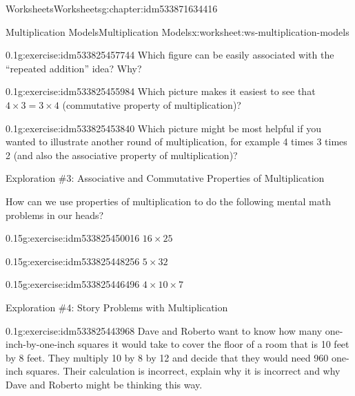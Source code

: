 \documentclass[twoside,11pt,]{book}
\begin{document}
\begin{chapterptx}{Worksheets}{}{Worksheets}{}{}{g:chapter:idm533871634416}
\begin{worksheet-section-numberless}{Multiplication Models}{}{Multiplication Models}{}{}{x:worksheet:ws-multiplication-models}
\begin{introduction}{}
\begin{description}
\begin{sidebyside}{1}{0.3}{0.3}{0}
\begin{sbspanel}{0.4}
\end{sbspanel}%
\end{sidebyside}%
\end{description}
\end{introduction}%
\begin{divisionexercise}{5}{}{0.1}{g:exercise:idm533825457744}%
Which figure can be easily associated with the ``repeated addition'' idea? Why?%
\end{divisionexercise}%
\begin{divisionexercise}{6}{}{0.1}{g:exercise:idm533825455984}%
Which picture makes it easiest to see that \(4 \times 3 = 3 \times 4 \) (commutative property of multiplication)?%
\end{divisionexercise}%
\begin{divisionexercise}{7}{}{0.1}{g:exercise:idm533825453840}%
Which picture might be most helpful if you wanted to illustrate another round of multiplication, for example 4 times 3 times 2 (and also the associative property of multiplication)?%
\end{divisionexercise}%
\clearpage
\begin{introduction}{}%
Exploration \#3: Associative and Commutative Properties of Multiplication%
\par
How can we use properties of multiplication to do the following mental math problems in our heads?%
\end{introduction}%
\begin{divisionexercise}{8}{}{0.15}{g:exercise:idm533825450016}%
\(16 \times 25  \)%
\end{divisionexercise}%
\begin{divisionexercise}{9}{}{0.15}{g:exercise:idm533825448256}%
\(5 \times 32  \)%
\end{divisionexercise}%
\begin{divisionexercise}{10}{}{0.15}{g:exercise:idm533825446496}%
\(4 \times 10 \times 7  \)%
\end{divisionexercise}%
\begin{introduction}{}%
Exploration \#4: Story Problems with Multiplication\end{introduction}%
\begin{divisionexercise}{11}{}{0.1}{g:exercise:idm533825443968}%
Dave and Roberto want to know how many one-inch-by-one-inch squares it would take to cover the floor of a room that is 10 feet by 8 feet.  They multiply 10 by 8 by 12 and decide that they would need 960 one-inch squares.  Their calculation is incorrect, explain why it is incorrect and why Dave and Roberto might be thinking this way.%

\end{divisionexercise}
\end{worksheet-section-numberless}
\end{chapterptx}
\end{document}

